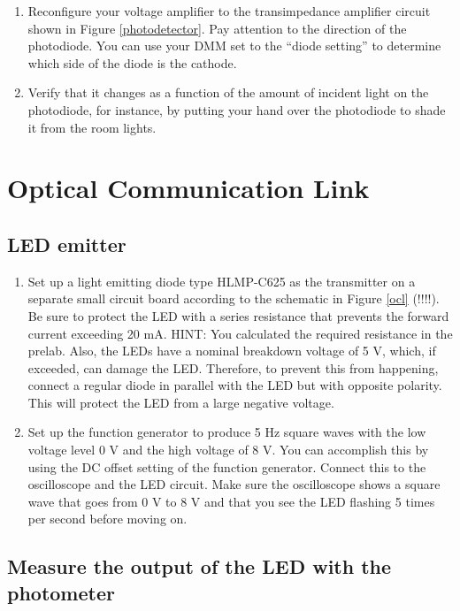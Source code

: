 \documentclass[10pt]{PhysLab1C} %
\begin{document}
\begin{enumerate}
    \item 
    Reconfigure your voltage amplifier to the transimpedance amplifier circuit shown in Figure \ref{photodetector}. Pay attention to the direction of the photodiode. You can use your DMM set to the
“diode setting” to determine which side of the diode is the cathode.
\item
Verify that it changes as a function of the amount of incident light on the photodiode,
for instance, by putting your hand over the photodiode to shade it from the room lights.
\end{enumerate}

\section{Optical Communication Link}

\subsection{LED emitter}

\begin{enumerate}
    \item 
    Set up a light emitting diode type HLMP-C625 as the transmitter on a separate small
circuit board according to the schematic in Figure \ref{ocl}  (!!!!). Be sure to protect the LED with
a series resistance that prevents the forward current exceeding 20 mA. HINT: You
calculated the required resistance in the prelab. Also, the LEDs have a nominal
breakdown voltage of 5 V, which, if exceeded, can damage the LED. Therefore, to
prevent this from happening, connect a regular diode in parallel with the LED but with
opposite polarity. This will protect the LED from a large negative voltage.
    \item
    Set up the function generator to produce 5 Hz square waves with the low voltage level
0 V and the high voltage of 8 V. You can accomplish this by using the DC offset setting
of the function generator. Connect this to the oscilloscope and the LED circuit. Make
sure the oscilloscope shows a square wave that goes from 0 V to 8 V and that you see
the LED flashing 5 times per second before moving on.
\end{enumerate}

\subsection{Measure the output of the LED with the photometer}
\end{document}
